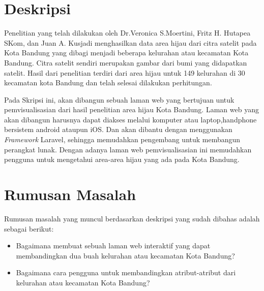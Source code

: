 \documentclass[a4paper,twoside]{article}
\begin{document}
\title{\@judultopik}
\author{\nama \textendash \@npm} 

\newcommand{\nama}{Bosnich Timothy Bonsaleng}
\newcommand{\@npm}{2017730086}
\newcommand{\@judultopik}{Pemvisualisasi Hasil Penelitian Area Hijau Kelurahan} %
\newcommand{\jumpemb}{1} %
\newcommand{\tanggal}{06/03/2023}


\maketitle


\section{Deskripsi}
Penelitian yang telah dilakukan oleh Dr.Veronica S.Moertini, Fritz H. Hutapea SKom, dan Juan A. Kusjadi menghasilkan data area hijau dari citra satelit pada Kota Bandung yang dibagi menjadi beberapa kelurahan atau kecamatan Kota Bandung. Citra satelit sendiri merupakan gambar dari bumi yang didapatkan satelit. Hasil dari penelitian terdiri dari area hijau untuk 149 kelurahan di 30 kecamatan kota Bandung dan telah selesai dilakukan perhitungan.
 
Pada Skripsi ini, akan dibangun sebuah laman web yang bertujuan untuk pemvisualisasian dari hasil penelitian area hijau Kota Bandung. Laman web yang akan dibangun harusnya dapat diakses melalui komputer atau laptop,handphone bersistem android ataupun iOS. Dan akan dibantu dengan menggunakan \emph{Framework} Laravel, sehingga memudahkan pengembang untuk membangun perangkat lunak. Dengan adanya laman web pemvisualisasian ini memudahkan pengguna untuk mengetahui area-area hijau yang ada pada Kota Bandung.

\section{Rumusan Masalah}
Rumusan masalah yang muncul berdasarkan deskripsi yang sudah dibahas
adalah sebagai berikut:
\begin{itemize}
	\item Bagaimana membuat sebuah laman web interaktif yang dapat membandingkan dua buah kelurahan atau kecamatan Kota Bandung?
	\item Bagaimana cara pengguna untuk membandingkan atribut-atribut dari kelurahan atau kecamatan Kota Bandung?
\end{itemize}
\end{document}
